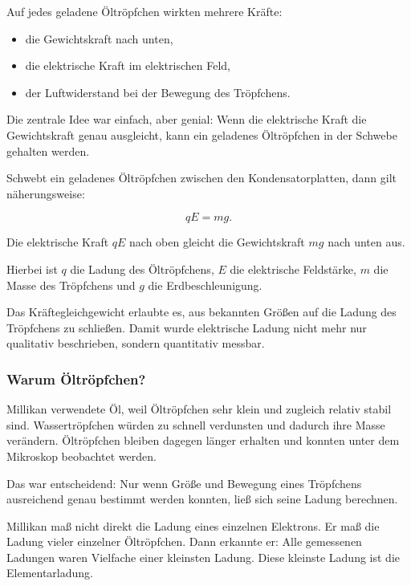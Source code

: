 Auf jedes geladene Öltröpfchen wirkten mehrere Kräfte:

\begin{itemize}
	\item die Gewichtskraft nach unten,
	\item die elektrische Kraft im elektrischen Feld,
	\item der Luftwiderstand bei der Bewegung des Tröpfchens.
\end{itemize}

Die zentrale Idee war einfach, aber genial:
Wenn die elektrische Kraft die Gewichtskraft genau ausgleicht,
kann ein geladenes Öltröpfchen in der Schwebe gehalten werden.

\FloatBarrier
\begin{PhysicsBox}
	\label{box:kraeftegleichgewicht-oeltroepfchen}
	Schwebt ein geladenes Öltröpfchen zwischen den Kondensatorplatten,
	dann gilt näherungsweise:
	
	\[
	qE = m g.
	\]
	
	Die elektrische Kraft \(qE\) nach oben gleicht die Gewichtskraft
	\(mg\) nach unten aus.
\end{PhysicsBox}

Hierbei ist \(q\) die Ladung des Öltröpfchens,
\(E\) die elektrische Feldstärke,
\(m\) die Masse des Tröpfchens
und \(g\) die Erdbeschleunigung.

Das Kräftegleichgewicht erlaubte es,
aus bekannten Größen auf die Ladung des Tröpfchens zu schließen.
Damit wurde elektrische Ladung nicht mehr nur qualitativ beschrieben,
sondern quantitativ messbar.

\subsubsection{Warum Öltröpfchen?}
\label{subsubsec:warum-oeltroepfchen}

Millikan verwendete Öl,
weil Öltröpfchen sehr klein und zugleich relativ stabil sind.
Wassertröpfchen würden zu schnell verdunsten und dadurch ihre Masse verändern.
Öltröpfchen bleiben dagegen länger erhalten
und konnten unter dem Mikroskop beobachtet werden.

Das war entscheidend:
Nur wenn Größe und Bewegung eines Tröpfchens ausreichend genau bestimmt
werden konnten,
ließ sich seine Ladung berechnen.

\begin{DidacticBox}
	\label{box:trick-millikan}
	Millikan maß nicht direkt die Ladung eines einzelnen Elektrons.
	Er maß die Ladung vieler einzelner Öltröpfchen.
	Dann erkannte er:
	Alle gemessenen Ladungen waren Vielfache einer kleinsten Ladung.
	Diese kleinste Ladung ist die Elementarladung.
\end{DidacticBox}

